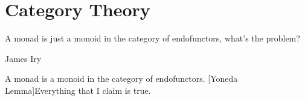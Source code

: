 \documentclass{scripts/preamble}
\begin{document}
    \chapter{Category Theory}\label{sec:simps}
    \epigraph{A monad is just a monoid in the category of endofunctors, what's the problem?}{James Iry}
    A monad is a monoid in the category of endofunctors.
    [Yoneda Lemma]{Everything that I claim is true.}
\end{document}
